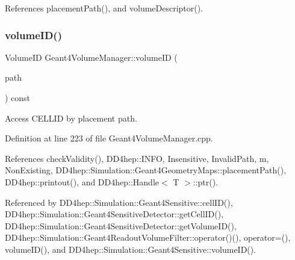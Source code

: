 References placement\+Path(), and volume\+Descriptor().

\hypertarget{class_d_d4hep_1_1_simulation_1_1_geant4_volume_manager_aa23614d7ae201b1e9b9a2f39a3cc5026}{}\label{class_d_d4hep_1_1_simulation_1_1_geant4_volume_manager_aa23614d7ae201b1e9b9a2f39a3cc5026} 
\subsubsection{\texorpdfstring{volume\+I\+D()}{volumeID()}\hspace{0.1cm}{\footnotesize\ttfamily [1/2]}}
{\footnotesize\ttfamily Volume\+ID Geant4\+Volume\+Manager\+::volume\+ID (\begin{DoxyParamCaption}\item[{const \hyperlink{class_d_d4hep_1_1_simulation_1_1_geant4_volume_manager_a990d8577e764541c4914263db1c6b0ca}{Placement\+Path} \&}]{path }\end{DoxyParamCaption}) const}



Access C\+E\+L\+L\+ID by placement path. 



Definition at line 223 of file Geant4\+Volume\+Manager.\+cpp.



References check\+Validity(), D\+D4hep\+::\+I\+N\+FO, Insensitive, Invalid\+Path, m, Non\+Existing, D\+D4hep\+::\+Simulation\+::\+Geant4\+Geometry\+Maps\+::placement\+Path(), D\+D4hep\+::printout(), and D\+D4hep\+::\+Handle$<$ T $>$\+::ptr().



Referenced by D\+D4hep\+::\+Simulation\+::\+Geant4\+Sensitive\+::cell\+I\+D(), D\+D4hep\+::\+Simulation\+::\+Geant4\+Sensitive\+Detector\+::get\+Cell\+I\+D(), D\+D4hep\+::\+Simulation\+::\+Geant4\+Sensitive\+Detector\+::get\+Volume\+I\+D(), D\+D4hep\+::\+Simulation\+::\+Geant4\+Readout\+Volume\+Filter\+::operator()(), operator=(), volume\+I\+D(), and D\+D4hep\+::\+Simulation\+::\+Geant4\+Sensitive\+::volume\+I\+D().

\hypertarget{class_d_d4hep_1_1_simulation_1_1_geant4_volume_manager_ace7bf7a749b8bfca537871b3de0bdd38}{}\label{class_d_d4hep_1_1_simulation_1_1_geant4_volume_manager_ace7bf7a749b8bfca537871b3de0bdd38} 
